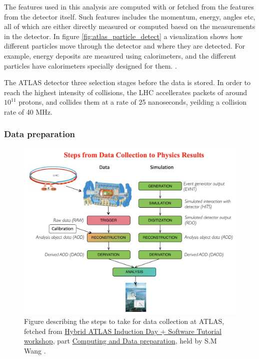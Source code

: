 The features used in this analysis are computed with or fetched from the features from the detector itself. Such features includes the momentum, energy, angles etc, 
all of which are either directly measured or computed baesd on the measurements in the detector. In figure \ref{fig:atlas_particle_detect} a visualization shows how
different particles move through the detector and where they are detected. For example, energy deposits are measured using calorimeters, and the different particles 
have calorimeters specially designed for them. . \par

The ATLAS detector three selection stages before the data is stored. In order to reach the highest intensity of collisions, the LHC accellerates
packets of around $10^{11}$ protons, and collides them at a rate of 25 nanoseconds, yeilding a collision rate of 40 MHz\cite{Wang:2707056}. \cite{Bernius:2707054}



\subsubsection*{Data preparation}


\begin{figure}[h!]
    \includegraphics[width=\linewidth]{Figures/atlas/data_col_phys.png}
    \caption{Figure describing the steps to take for data collection at ATLAS, fetched from \href{https://indico.cern.ch/event/1159574/timetable/?view=standard}{Hybrid ATLAS Induction Day + Software Tutorial workshop}, part
    \href{https://indico.cern.ch/event/860971/contributions/3672974/attachments/1972049/3280896/Atlas_computing_data_preparation_jan20.pdf}{Computing and Data preparation}, 
    held by S.M Wang \cite{Wang:2707056} . }
    \label{fig:atlas_data_col_phys}
\end{figure}



